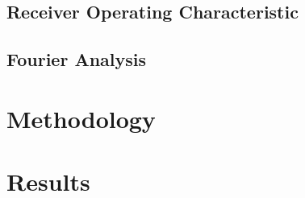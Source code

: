 \documentclass{article}
\begin{document}

\subsection{Receiver Operating Characteristic}


\subsection{Fourier Analysis}


\section{Methodology}



\section{Results}

\end{document}

